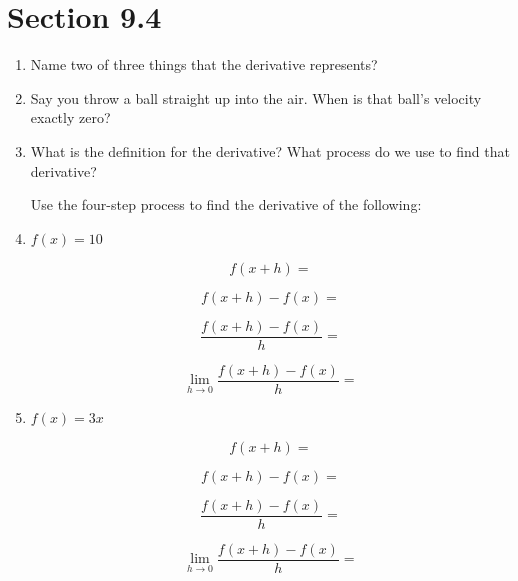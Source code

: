 \documentclass[14pt]{extarticle}
\begin{document}
\section{Section 9.4}
\begin{enumerate}
	\item Name two of three things that the derivative represents? \vspace{1cm}
	
	\item Say you throw a ball straight up into the air. When is that ball's velocity exactly zero? \vspace{1cm}
	
	\item What is the definition for the derivative? What process do we use to find that derivative? \vspace{2cm}
	
	Use the four-step process to find the derivative of the following:
	\item $f(x) = 10$
	\begin{fleqn}\begin{equation*}f(x+h) =\end{equation*} \end{fleqn}
	\begin{fleqn}\begin{equation*}f(x+h) - f(x) =\end{equation*} \end{fleqn}
	\begin{fleqn}\begin{equation*}\frac{f(x+h) - f(x)}{h} =\end{equation*} \end{fleqn}
	\begin{fleqn}\begin{equation*}\lim_{h\to 0}\frac{f(x+h) - f(x)}{h} =\end{equation*} \end{fleqn}
	\vspace{1cm}

	\item $f(x) = 3x$ 
	\begin{fleqn}\begin{equation*}f(x+h) =\end{equation*} \end{fleqn}
	\vspace{1cm}
	\begin{fleqn}\begin{equation*}f(x+h) - f(x) =\end{equation*} \end{fleqn}
	\vspace{1cm}
	\begin{fleqn}\begin{equation*}\frac{f(x+h) - f(x)}{h} =\end{equation*} \end{fleqn}
	\vspace{1cm}
	\begin{fleqn}\begin{equation*}\lim_{h\to 0}\frac{f(x+h) - f(x)}{h} =\end{equation*} \end{fleqn}
	\vspace{1cm}
	

\end{enumerate}
\end{document}
